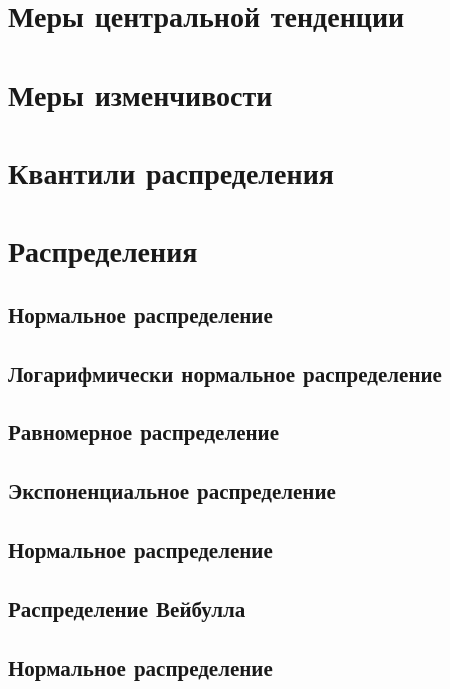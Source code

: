\documentclass[]{scrartcl}
\begin{document}
\section{Меры центральной тенденции}

\section{Меры изменчивости}

\section{Квантили распределения}

\section{Распределения}

\subsection{Нормальное распределение}

\subsection{Логарифмически нормальное распределение}

\subsection{Равномерное распределение}

\subsection{Экспоненциальное распределение}

\subsection{Нормальное распределение}

\subsection{Распределение Вейбулла}

\subsection{Нормальное распределение}
\end{document}
